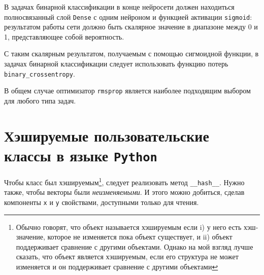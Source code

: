 \documentclass[%
	11pt,
	a4paper,
	utf8,
		]{article}
\begin{document}
В задачах бинарной классификации в конце нейросети должен находиться полносвязанный слой \texttt{Dense} с одним нейроном и функцией активации \texttt{sigmoid}: результатом работы сети должно быть скалярное значение в диапазоне между 0 и 1, представляющее собой вероятность.

С таким скалярным результатом, получаемым с помощью сигмоидной функции, в задачах бинарной классификации следует использовать функцию потерь \texttt{binary\_crossentropy}.

В общем случае оптимизатор \texttt{rmsprop} является наиболее подходящим выбором для любого типа задач.



\section{Хэшируемые пользовательские классы в языке \texttt{Python}}

Чтобы класс был хэшируемым\footnote{Обычно говорят, что объект называется хэшируемым если i) у него есть хэш-значение, которое не изменяется пока объект существует, и ii) объект поддерживает сравнение с другими объектами. Однако на мой взгляд лучше сказать, что объект является хэшируемым, если его структура не может изменяется и он поддерживает сравнение с другими объектами}, следует реализовать метод \texttt{\_\_hash\_\_}. Нужно также, чтобы векторы были \emph{неизменяемыми}. И этого можно добиться, сделав компоненты \texttt{x} и \texttt{y} свойствами, доступными только для чтения.
\end{document}

